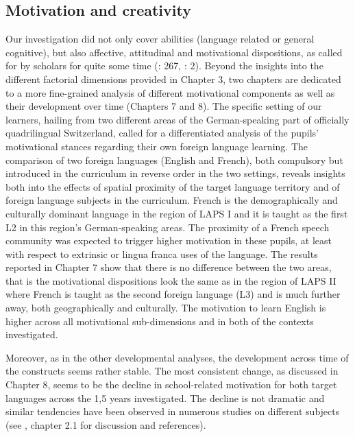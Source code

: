 \documentclass[output=paper]{langsci/langscibook}
\begin{document}
\subsection{Motivation and creativity}

Our investigation did not only cover abilities (language related or general cognitive), but also affective, attitudinal and motivational dispositions, as called for by scholars for quite some time (\citealt{Doernyei2010}: 267, \citealt{ParryStansfield1990}: 2). Beyond the insights into the different factorial dimensions provided in Chapter 3, two chapters are dedicated to a more fine-grained analysis of different motivational components as well as their development over time (Chapters 7 and 8). The specific setting of our learners, hailing from two different areas of the German-speaking part of officially quadrilingual Switzerland, called for a differentiated analysis of the pupils’ motivational stances regarding their own foreign language learning. The comparison of two foreign languages (English and French), both compulsory but introduced in the curriculum in reverse order in the two settings, reveals insights both into the effects of spatial proximity of the target language territory and of foreign language subjects in the curriculum. French is the demographically and culturally dominant language in the region of LAPS I and it is taught as the first L2 in this region’s German-speaking areas. The proximity of a French speech community was expected to trigger higher motivation in these pupils, at least with respect to extrinsic or lingua franca uses of the language. The results reported in Chapter 7 show that there is no difference between the two areas, that is the motivational dispositions look the same as in the region of LAPS II where French is taught as the second foreign language (L3) and is much further away, both geographically and culturally. The motivation to learn English is higher across all motivational sub-dimensions and in both of the contexts investigated.

Moreover, as in the other developmental analyses, the development across time of the constructs seems rather stable. The most consistent change, as discussed in Chapter 8, seems to be the decline in school-related motivation for both target languages across the 1,5 years investigated. The decline is not dramatic and similar tendencies have been observed in numerous studies on different subjects (see \citealt{Shan2020}, chapter 2.1 for discussion and references).
\end{document}
